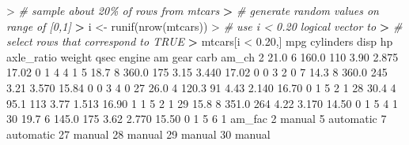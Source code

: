 \documentclass[
]{book}
\newenvironment{Shaded}{\begin{snugshade}}{\end{snugshade}}
\newcommand{\CommentTok}[1]{\textcolor[rgb]{0.56,0.35,0.01}{\textit{#1}}}
\newcommand{\DecValTok}[1]{\textcolor[rgb]{0.00,0.00,0.81}{#1}}
\newcommand{\ErrorTok}[1]{\textcolor[rgb]{0.64,0.00,0.00}{\textbf{#1}}}
\newcommand{\FloatTok}[1]{\textcolor[rgb]{0.00,0.00,0.81}{#1}}
\newcommand{\FunctionTok}[1]{\textcolor[rgb]{0.00,0.00,0.00}{#1}}
\newcommand{\NormalTok}[1]{#1}
\newcommand{\OtherTok}[1]{\textcolor[rgb]{0.56,0.35,0.01}{#1}}
\newcommand{\SpecialCharTok}[1]{\textcolor[rgb]{0.00,0.00,0.00}{#1}}
\begin{document}
\begin{Shaded}
\begin{Highlighting}[]
\SpecialCharTok{\textgreater{}} \CommentTok{\# sample about 20\% of rows from mtcars}
\ErrorTok{\textgreater{}} \CommentTok{\# generate random values on range of [0,1]}
\ErrorTok{\textgreater{}}\NormalTok{ i }\OtherTok{\textless{}{-}} \FunctionTok{runif}\NormalTok{(}\FunctionTok{nrow}\NormalTok{(mtcars))}
\SpecialCharTok{\textgreater{}} \CommentTok{\# use i \textless{} 0.20 logical vector to }
\ErrorTok{\textgreater{}} \CommentTok{\# select rows that correspond to TRUE}
\ErrorTok{\textgreater{}}\NormalTok{ mtcars[i }\SpecialCharTok{\textless{}} \FloatTok{0.20}\NormalTok{,]}
\NormalTok{    mpg cylinders  disp  hp axle\_ratio weight  qsec engine am gear carb am\_ch}
\DecValTok{2}  \FloatTok{21.0}         \DecValTok{6} \FloatTok{160.0} \DecValTok{110}       \FloatTok{3.90}  \FloatTok{2.875} \FloatTok{17.02}      \DecValTok{0}  \DecValTok{1}    \DecValTok{4}    \DecValTok{4}     \DecValTok{1}
\DecValTok{5}  \FloatTok{18.7}         \DecValTok{8} \FloatTok{360.0} \DecValTok{175}       \FloatTok{3.15}  \FloatTok{3.440} \FloatTok{17.02}      \DecValTok{0}  \DecValTok{0}    \DecValTok{3}    \DecValTok{2}     \DecValTok{0}
\DecValTok{7}  \FloatTok{14.3}         \DecValTok{8} \FloatTok{360.0} \DecValTok{245}       \FloatTok{3.21}  \FloatTok{3.570} \FloatTok{15.84}      \DecValTok{0}  \DecValTok{0}    \DecValTok{3}    \DecValTok{4}     \DecValTok{0}
\DecValTok{27} \FloatTok{26.0}         \DecValTok{4} \FloatTok{120.3}  \DecValTok{91}       \FloatTok{4.43}  \FloatTok{2.140} \FloatTok{16.70}      \DecValTok{0}  \DecValTok{1}    \DecValTok{5}    \DecValTok{2}     \DecValTok{1}
\DecValTok{28} \FloatTok{30.4}         \DecValTok{4}  \FloatTok{95.1} \DecValTok{113}       \FloatTok{3.77}  \FloatTok{1.513} \FloatTok{16.90}      \DecValTok{1}  \DecValTok{1}    \DecValTok{5}    \DecValTok{2}     \DecValTok{1}
\DecValTok{29} \FloatTok{15.8}         \DecValTok{8} \FloatTok{351.0} \DecValTok{264}       \FloatTok{4.22}  \FloatTok{3.170} \FloatTok{14.50}      \DecValTok{0}  \DecValTok{1}    \DecValTok{5}    \DecValTok{4}     \DecValTok{1}
\DecValTok{30} \FloatTok{19.7}         \DecValTok{6} \FloatTok{145.0} \DecValTok{175}       \FloatTok{3.62}  \FloatTok{2.770} \FloatTok{15.50}      \DecValTok{0}  \DecValTok{1}    \DecValTok{5}    \DecValTok{6}     \DecValTok{1}
\NormalTok{      am\_fac}
\DecValTok{2}\NormalTok{     manual}
\DecValTok{5}\NormalTok{  automatic}
\DecValTok{7}\NormalTok{  automatic}
\DecValTok{27}\NormalTok{    manual}
\DecValTok{28}\NormalTok{    manual}
\DecValTok{29}\NormalTok{    manual}
\DecValTok{30}\NormalTok{    manual}
\end{Highlighting}
\end{Shaded}
\end{document}
